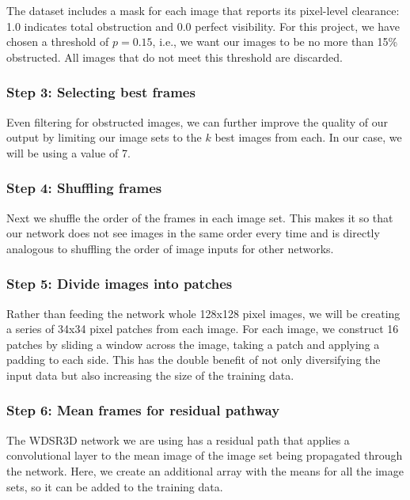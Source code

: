 \documentclass{article}
\begin{document}
The dataset includes a mask for each image that reports its pixel-level clearance: 1.0 indicates total obstruction and 0.0 perfect visibility. For this project, we have chosen a threshold of $p=0.15$, i.e., we want our images to be no more than 15\% obstructed. All images that do not meet this threshold are discarded.

\subsubsection{Step 3: Selecting best frames}

Even filtering for obstructed images, we can further improve the quality of our output by limiting our image sets to the $k$ best images from each. In our case, we will be using a value of 7. 

\subsubsection{Step 4: Shuffling frames}

 Next we shuffle the order of the frames in each image set. This makes it so that our network does not see images in the same order every time and is directly analogous to shuffling the order of image inputs for other networks.  

\subsubsection{Step 5: Divide images into patches}

Rather than feeding the network whole 128x128 pixel images, we will be creating a series of 34x34 pixel patches from each image. For each image, we construct 16 patches by sliding a window across the image, taking a patch and applying a padding to each side. This has the double benefit of not only diversifying the input data but also increasing the size of the training data.

\subsubsection{Step 6: Mean frames for residual pathway}

The WDSR3D network we are using has a residual path that applies a convolutional layer to the mean image of the image set being propagated through the network. Here, we create an additional array with the means for all the image sets, so it can be added to the training data.
\end{document}

